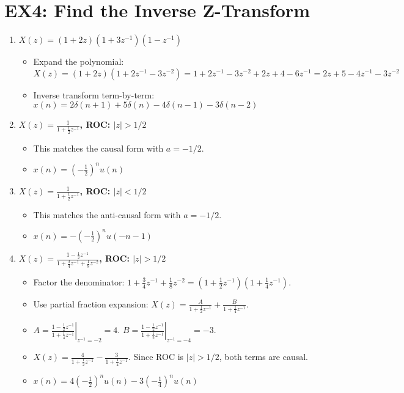 \documentclass[a4paper,12pt]{article}
\begin{document}
\section*{EX4: Find the Inverse Z-Transform}
\begin{enumerate}
    \item \textbf{$X(z) = (1+2z)(1+3z^{-1})(1-z^{-1})$}
        \begin{itemize}
            \item Expand the polynomial:
            $X(z) = (1+2z)(1+2z^{-1}-3z^{-2}) = 1 + 2z^{-1} - 3z^{-2} + 2z + 4 - 6z^{-1} = 2z + 5 - 4z^{-1} - 3z^{-2}$
            \item Inverse transform term-by-term:
            $x(n) = 2\delta(n+1) + 5\delta(n) - 4\delta(n-1) - 3\delta(n-2)$
        \end{itemize}

    \item \textbf{$X(z) = \frac{1}{1+\frac{1}{2}z^{-1}}$, ROC: $|z| > 1/2$}
        \begin{itemize}
            \item This matches the causal form with $a=-1/2$.
            \item $x(n) = (-\frac{1}{2})^n u(n)$
        \end{itemize}

    \item \textbf{$X(z) = \frac{1}{1+\frac{1}{2}z^{-1}}$, ROC: $|z| < 1/2$}
        \begin{itemize}
            \item This matches the anti-causal form with $a=-1/2$.
            \item $x(n) = -(-\frac{1}{2})^n u(-n-1)$
        \end{itemize}

    \item \textbf{$X(z) = \frac{1-\frac{1}{2}z^{-1}}{1+\frac{3}{4}z^{-1}+\frac{1}{8}z^{-2}}$, ROC: $|z| > 1/2$}
        \begin{itemize}
            \item Factor the denominator: $1+\frac{3}{4}z^{-1}+\frac{1}{8}z^{-2} = (1+\frac{1}{2}z^{-1})(1+\frac{1}{4}z^{-1})$.
            \item Use partial fraction expansion: $X(z) = \frac{A}{1+\frac{1}{2}z^{-1}} + \frac{B}{1+\frac{1}{4}z^{-1}}$.
            \item $A = \left. \frac{1-\frac{1}{2}z^{-1}}{1+\frac{1}{4}z^{-1}} \right|_{z^{-1}=-2} = 4$. $B = \left. \frac{1-\frac{1}{2}z^{-1}}{1+\frac{1}{2}z^{-1}} \right|_{z^{-1}=-4} = -3$.
            \item $X(z) = \frac{4}{1+\frac{1}{2}z^{-1}} - \frac{3}{1+\frac{1}{4}z^{-1}}$. Since ROC is $|z|>1/2$, both terms are causal.
            \item $x(n) = 4(-\frac{1}{2})^n u(n) - 3(-\frac{1}{4})^n u(n)$
        \end{itemize}


\end{enumerate}
\end{document}
